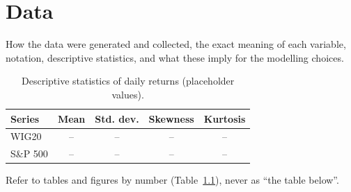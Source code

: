 \chapter{Data}

How the data were generated and collected, the exact meaning of each variable, notation, descriptive statistics, and what these imply for the modelling choices.

\begin{table}[H]
  \caption{Descriptive statistics of daily returns (placeholder values).}
  \label{tab:descriptive}
  \centering
  \begin{tabular}{lcccc}
    \toprule
    \textbf{Series} & \textbf{Mean} & \textbf{Std. dev.} & \textbf{Skewness} & \textbf{Kurtosis} \\
    \midrule
    WIG20 & -- & -- & -- & -- \\
    S\&P 500 & -- & -- & -- & -- \\
    \bottomrule
  \end{tabular}
\end{table}

Refer to tables and figures by number (Table~\ref{tab:descriptive}), never as ``the table below''.
